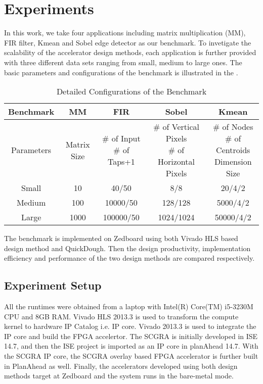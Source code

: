 \section{Experiments}\label{sec:experiments}
In this work, we take four applications including matrix multiplication (MM), FIR filter, Kmean and Sobel edge detector as our benchmark. To invetigate the scalability of the accelerator design methods, each application is further provided with three different data sets ranging from small, medium to large ones. The basic parameters and configurations of the benchmark is illustrated in the .

\begin{table*}[t]
  \caption{Detailed Configurations of the Benchmark}
  \label{tab:benchmark-config}
  \centering
  \begin{tabular}{c|c|c|c|c}
  \hline
  Benchmark & MM & FIR & Sobel & Kmean \\ \hline
  Parameters & Matrix Size & \tabincell{c}{\# of Input \\ \# of Taps+1} & \tabincell{c}{ \# of Vertical Pixels \\ \# of Horizontal Pixels} & \tabincell{c}{\# of Nodes \\ \# of Centroids \\ Dimension Size} \\ \hline
  Small & 10 & 40/50 & 8/8 & 20/4/2 \\ \hline
  Medium & 100 & 10000/50 & 128/128 & 5000/4/2  \\ \hline
  Large & 1000 & 100000/50 & 1024/1024 & 50000/4/2 \\ \hline
  \end{tabular}
\end{table*}

The benchmark is implemented on Zedboard using both Vivado HLS based design method and QuickDough. Then the design productivity, implementation efficiency and performance of the two design methods are compared respectively.

\subsection{Experiment Setup}
All the runtimes were obtained from a laptop with Intel(R) Core(TM) i5-3230M CPU and 8GB RAM. Vivado HLS 2013.3 is used to transform the compute kernel to hardware IP Catalog i.e. IP core. Vivado 2013.3 is used to integrate the IP core and build the FPGA accelertor. The SCGRA is initially developed in ISE 14.7, and then the ISE project is imported as an IP core in planAhead 14.7. With the SCGRA IP core, the SCGRA overlay based FPGA accelerator is further built in PlanAhead as well. Finally, the accelerators developed using both design methods target at Zedboard \cite{zedboard} and the system runs in the bare-metal mode.

